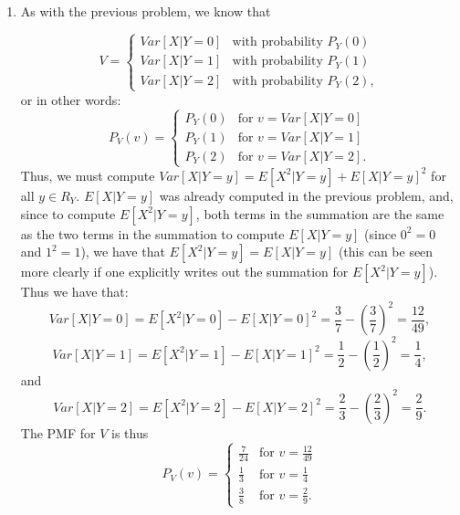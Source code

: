 \begin{problem}{14} $ $
\begin{enumerate}


\item As with the previous problem, we know that

\[
  V =
  \begin{cases}
                                   Var[X|Y=0]& \text{with probability $P_Y(0)$} \\
                                   Var[X|Y=1]& \text{with probability $P_Y(1)$} \\
                                  Var[X|Y=2]& \text{with probability $P_Y(2)$},
   \end{cases}
\]
or in other words:
 \[
  P_{V}(v) =
  \begin{cases}
                                   P_Y(0) & \text{for $v=Var[X|Y=0]$} \\
                                    P_Y(1) & \text{for $v=Var[X|Y=1]$} \\
                                   P_Y(2) & \text{for $v=Var[X|Y=2]$}.
   \end{cases}
\]
Thus, we must compute $Var[X|Y=y] = E[X^2|Y=y]+E[X|Y=y]^2$ for all $y \in R_Y$.  $E[X|Y=y]$ was already computed in the previous problem, and, since to compute $E[X^2|Y=y]$, both terms in the summation are the same as the two terms in the summation to compute $E[X|Y=y]$ (since $0^2=0$ and $1^2=1$), we have that $E[X^2|Y=y]=E[X|Y=y]$ (this can be seen more clearly if one explicitly writes out the summation for $E[X^2|Y=y]$).  Thus we have that:
\begin{equation*}
Var[X|Y=0] =  E[X^2|Y=0]-E[X|Y=0]^2 = \frac{3}{7} -\left ( \frac{3}{7} \right)^2 = \frac{12}{49},
\end{equation*}
\begin{equation*}
Var[X|Y=1] =  E[X^2|Y=1]-E[X|Y=1]^2 = \frac{1}{2} -\left ( \frac{1}{2} \right)^2 = \frac{1}{4},
\end{equation*}
and
\begin{equation*}
Var[X|Y=2] =  E[X^2|Y=2]-E[X|Y=2]^2 = \frac{2}{3} -\left ( \frac{2}{3} \right)^2 = \frac{2}{9}.
\end{equation*}
The PMF for $V$ is thus
 \[
  P_{V}(v) =
  \begin{cases}
                                   \frac{7}{24} & \text{for $v=\frac{12}{49}$} \\
                                    \frac{1}{3} & \text{for $v=\frac{1}{4}$} \\
                                   \frac{3}{8} & \text{for $v=\frac{2}{9}$}.
   \end{cases}
\]


\end{enumerate}
\end{problem}
